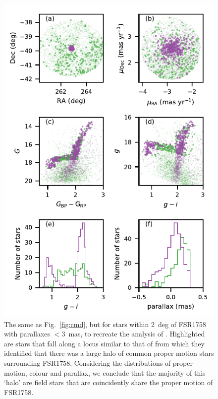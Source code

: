 \documentclass[fleqn,usenatbib,letters]{mnras}
\begin{document}
\begin{figure}
	\includegraphics[width=\columnwidth]{figures/not_a_halo.pdf}
    \caption{The same as Fig.\ \ref{fig:cmd}, but for stars within 2~deg of FSR1758 with parallaxes $<3$~mas, to recreate the analysis of . Highlighted are stars that fall along a locus similar to that of  from which they identified that there was a large halo of common proper motion stars surrounding FSR1758. Considering the distributions of proper motion, colour and parallax, we conclude that the majority of this `halo' are field stars that are coincidently share the proper motion of FSR1758.}
    \label{fig:not_a_halo}
\end{figure}
\end{document}

